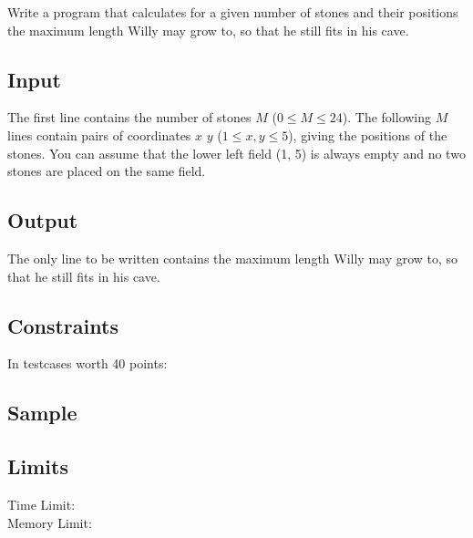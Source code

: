 Write a program that calculates for a given number of stones and their positions the maximum length Willy may grow to, so that he still fits in his cave.

\subsection*{Input}

The first line contains the number of stones $M$ ($0 \le M \le 24$). The following $M$ lines contain pairs of coordinates $x$ $y$ ($1\le x, y\le 5$), giving the positions of the stones. You can assume that the lower left field (1, 5) is always empty and no two stones are placed on the same field.

\subsection*{Output}

The only line to be written contains the maximum length Willy may grow to, so that he still fits in his cave.

\subsection*{Constraints}

In testcases worth 40 points: 

\subsection*{Sample}
\showcases

\subsection*{Limits}
Time Limit: \timelimit \\
Memory Limit: \memlimit


